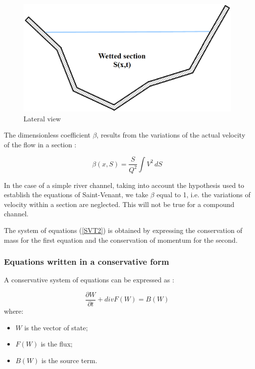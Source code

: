 \begin{figure}
 \begin{center}
  \includegraphics[scale=0.8]{Figures/VueLat.eps}
  \caption{Lateral view}
 \end{center}
\end{figure}

The dimensionless coefficient $\beta$, results from the variations of the actual velocity of the flow in a section :

\begin{equation}
 \beta(x,S) = \frac{S}{Q^2} \int V^2 \,dS
\end{equation}

\vspace{0.5cm}

In the case of a simple river channel, taking into account the hypothesis used to establish the equations of Saint-Venant, we take $\beta$ equal to 1, i.e. the variations of velocity within a section are neglected. This will not be true for a compound channel.

\vspace{0.5cm}

The system of equations (\ref{SVT2}) is obtained by expressing the conservation of mass for the first equation and the conservation of momentum for the second.



\subsubsection{Equations written in a conservative form}

A conservative system of equations can be expressed as :

\begin{equation}
  \frac{\partial W}{\partial t} + divF(W) = B(W)
\end{equation}
where:
\begin{itemize}
 \item $W$ is the vector of state;
 \item $F(W)$ is the flux;
 \item $B(W)$ is the source term.
\end{itemize}


